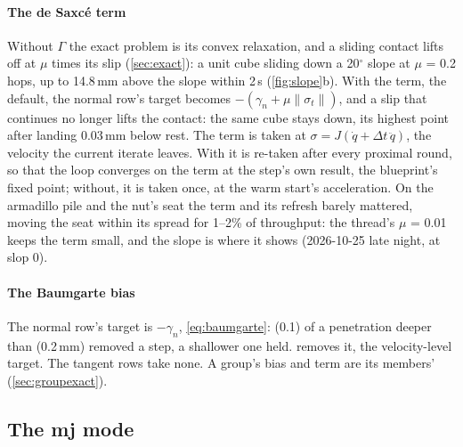 \paragraph{The de Saxc\'e term} Without $\Gamma$ the exact problem is its convex relaxation, and a sliding contact lifts off at $\mu$ times its slip (\cref{sec:exact}): a unit cube sliding down a 20$^\circ$ slope at $\mu$ = 0.2 hops, up to 14.8\,mm above the slope within 2\,s (\cref{fig:slope}b). With the term, the default, the normal row's target becomes $-(\gamma_n + \mu\lVert\sigma_t\rVert)$, and a slip that continues no longer lifts the contact: the same cube stays down, its highest point after landing 0.03\,mm below rest. The term is taken at $\sigma = J(\dot q + \Delta t\,\ddot q)$, the velocity the current iterate leaves. With  it is re-taken after every proximal round, so that the loop converges on the term at the step's own result, the blueprint's fixed point; without, it is taken once, at the warm start's acceleration. On the armadillo pile and the nut's seat the term and its refresh barely mattered, moving the seat within its spread for 1--2\% of throughput: the thread's $\mu$ = 0.01 keeps the term small, and the slope is where it shows (2026-10-25 late night, at slop 0).

\paragraph{The Baumgarte bias} The normal row's target is $-\gamma_n$, \cref{eq:baumgarte}:  (0.1) of a penetration deeper than  (0.2\,mm) removed a step, a shallower one held.  removes it, the velocity-level target. The tangent rows take none. A group's bias and term are its members' (\cref{sec:groupexact}).

\subsection{The mj mode}\label{sec:pcmj}

